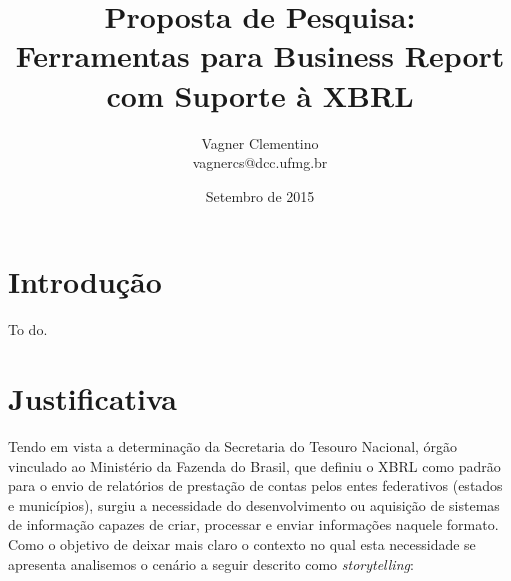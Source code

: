 \documentclass{article}
\title{Proposta de Pesquisa: \\
Ferramentas para Business Report com Suporte à XBRL
}
\author{Vagner Clementino \\ 
       vagnercs@dcc.ufmg.br}
\date{Setembro de  2015}
\begin{document}
\maketitle

\section{Introdução}
\label{sec:intro}

To do.

\section{Justificativa}
\label{sec:contexto}

Tendo em vista a determinação da Secretaria do Tesouro Nacional, órgão vinculado ao  Ministério da Fazenda do Brasil, que definiu o XBRL como padrão para o envio de relatórios de prestação de contas pelos entes federativos (estados e municípios), surgiu a necessidade do desenvolvimento ou aquisição de sistemas de informação capazes de criar, processar e enviar informações naquele formato. Como o objetivo de deixar mais claro o contexto no qual esta necessidade se apresenta analisemos o cenário a seguir descrito como \textit{storytelling}:
\\
\\
\end{document}
